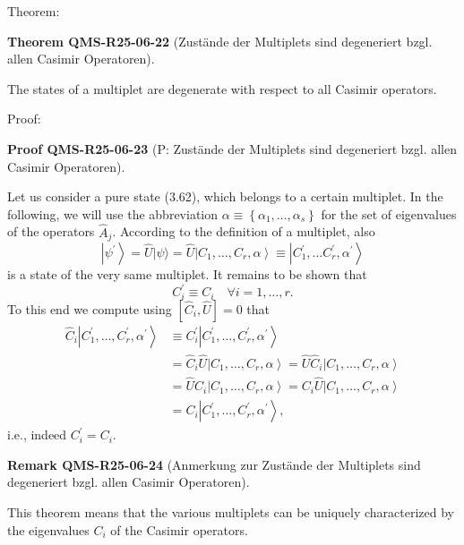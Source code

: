 \documentclass[10pt, letterpaper]{article}
\newcommand{\CustomHeading}[3]{%
  \par\medskip\noindent%
  \textbf{#1 #2} \textnormal{(#3)}.\enskip%
}
\newenvironment{THEO}[2]{\begin{unitbox}\CustomHeading{Theorem}{#1}{#2}}{\end{unitbox}}
\newenvironment{REM}[2]{\begin{unitbox}\CustomHeading{Remark}{#1}{#2}}{\end{unitbox}}
\newenvironment{PROOF}[2]{\begin{unitbox}\CustomHeading{Proof}{#1}{#2}}{\end{unitbox}}
\begin{document}
Theorem: 


\begin{THEO}{QMS-R25-06-22}{Zustände der Multiplets sind degeneriert bzgl. allen Casimir Operatoren}
The states of a multiplet are degenerate with respect to all Casimir operators.
\end{THEO}

Proof: 


\begin{PROOF}{QMS-R25-06-23}{P: Zustände der Multiplets sind degeneriert bzgl. allen Casimir Operatoren}
Let us consider a pure state (3.62), which belongs to a certain multiplet. In the following, we will use the abbreviation $\alpha \equiv\left\{\alpha_{1}, \ldots, \alpha_{s}\right\}$ for the set of eigenvalues of the operators $\hat{A}_{j}$. According to the definition of a multiplet, also
$$
\left|\psi^{\prime}\right\rangle=\hat{U}|\psi\rangle=\hat{U}\left|C_{1}, \ldots, C_{r}, \alpha\right\rangle \equiv\left|C_{1}^{\prime}, \ldots C_{r}^{\prime}, \alpha^{\prime}\right\rangle
$$
is a state of the very same multiplet. It remains to be shown that
$$
C_{i}^{\prime} \equiv C_{i} \quad \forall i=1, \ldots, r .
$$
To this end we compute using $\left[\hat{C}_{i}, \hat{U}\right]=0$ that
$$
\begin{aligned}
\hat{C}_{i}\left|C_{1}^{\prime}, \ldots, C_{r}^{\prime}, \alpha^{\prime}\right\rangle & \equiv C_{i}^{\prime}\left|C_{1}^{\prime}, \ldots, C_{r}^{\prime}, \alpha^{\prime}\right\rangle \\
& =\hat{C}_{i} \hat{U}\left|C_{1}, \ldots, C_{r}, \alpha\right\rangle=\hat{U} \hat{C}_{i}\left|C_{1}, \ldots, C_{r}, \alpha\right\rangle \\
& =\hat{U} C_{i}\left|C_{1}, \ldots, C_{r}, \alpha\right\rangle=C_{i} \hat{U}\left|C_{1}, \ldots, C_{r}, \alpha\right\rangle \\
& =C_{i}\left|C_{1}^{\prime}, \ldots, C_{r}^{\prime}, \alpha^{\prime}\right\rangle,
\end{aligned}
$$
i.e., indeed $C_{i}^{\prime}=C_{i}$.
\end{PROOF}




\begin{REM}{QMS-R25-06-24}{Anmerkung zur Zustände der Multiplets sind degeneriert bzgl. allen Casimir Operatoren}
This theorem means that the various multiplets can be uniquely characterized by the eigenvalues $C_{i}$ of the Casimir operators.
\end{REM}
\end{document}
